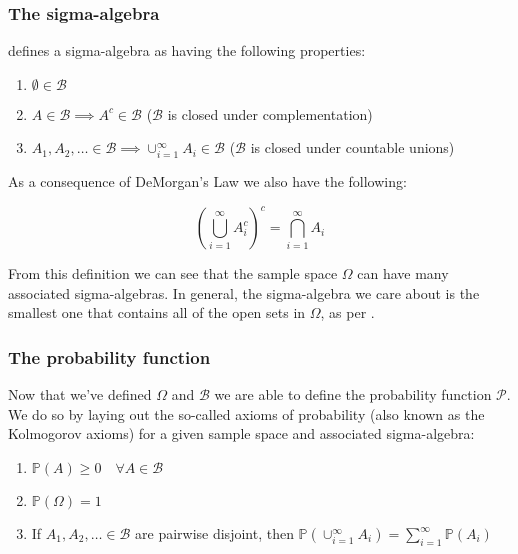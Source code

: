 \documentclass{report}
\begin{document}
\subsubsection{The sigma-algebra}

\cite[Chapter~1.2.1]{casella_statistical_2002} defines a sigma-algebra as having the following properties:

\begin{enumerate}
    \item $\emptyset \in \mathcal{B}$
    \item $A \in \mathcal{B} \implies A^c \in \mathcal{B}$ ($\mathcal{B}$ is closed under complementation)
    \item $A_1, A_2, \dots \in \mathcal{B} \implies \cup_{i=1}^\infty A_i \in \mathcal{B}$ ($\mathcal{B}$ is closed under countable unions)
\end{enumerate}

As a consequence of DeMorgan's Law we also have the following:

\begin{equation}\label{eq:demorgans-law-consequence}
    \left(\bigcup_{i=1}^\infty A_i^c\right)^c = \bigcap_{i=1}^\infty A_i
\end{equation}

From this definition we can see that the sample space $\Omega$ can have many associated sigma-algebras. In general, the sigma-algebra we care about is the smallest one that contains all of the open sets in $\Omega$, as per \cite[Chapter~1.2.1]{casella_statistical_2002}. 

\subsubsection{The probability function}

Now that we've defined $\Omega$ and $\mathcal{B}$ we are able to define the probability function $\mathcal{P}$. We do so by laying out the so-called axioms of probability (also known as the Kolmogorov axioms) for a given sample space and associated sigma-algebra:

\begin{enumerate}
    \item $\mathbb{P}(A) \geq 0 \quad \forall A \in \mathcal{B}$
    \item $\mathbb{P}(\Omega) = 1$
    \item If $A_1, A_2, \dots \in \mathcal{B}$ are pairwise disjoint, then $\mathbb{P} \left(\cup_{i=1}^\infty A_i\right) = \sum_{i=1}^\infty \mathbb{P}(A_i)$
\end{enumerate}
\end{document}
